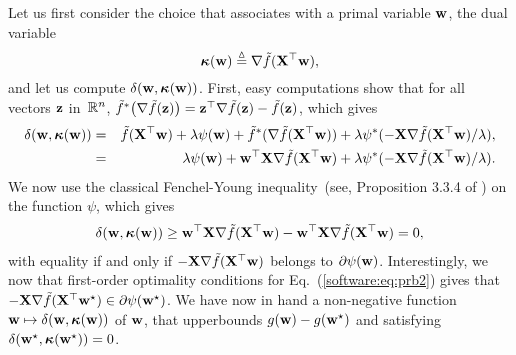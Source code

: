 \documentclass[a4paper, 11pt]{article}
\begin{document}
                Let us first consider the choice that associates with a primal variable ${\mathbf w}$, the
                dual variable 
                \begin{equation}
                {\boldsymbol\kappa}({\mathbf w}) \stackrel{\vartriangle}{=} \nabla \tilde{f}({\mathbf X}^\top{\mathbf w}), \label{software:eq:kappab}
                \end{equation}
                and let us compute $\delta({\mathbf w},{\boldsymbol\kappa}({\mathbf w}))$.
                First, easy computations show that for all vectors ${\mathbf z}$ in~${\mathbb R}^n$,
                $\tilde{f}^\ast\big(\nabla\tilde{f}({\mathbf z})\big) = {\mathbf z}^\top\nabla\tilde{f}({\mathbf z})-\tilde{f}({\mathbf z})$,
                which gives
                \begin{eqnarray}
                \delta({\mathbf w},{\boldsymbol\kappa}({\mathbf w})) &=& \tilde{f}({\mathbf X}^\top {\mathbf w}) + \lambda \psi({\mathbf w}) + \tilde{f}^\ast(\nabla\tilde{f}({\mathbf X}^\top{\mathbf w})) + \lambda\psi^\ast(-{\mathbf X}\nabla\tilde{f}({\mathbf X}^\top{\mathbf w})/ \lambda), \\
                                         &=& \lambda \psi({\mathbf w}) + {\mathbf w}^\top{\mathbf X}\nabla\tilde{f}({\mathbf X}^\top{\mathbf w}) + \lambda\psi^\ast(-{\mathbf X}\nabla\tilde{f}({\mathbf X}^\top{\mathbf w})/ \lambda). 
                                         \end{eqnarray}
                                         We now use the classical Fenchel-Young inequality~(see, Proposition
                                               3.3.4 of \cite{borwein}) on the function $\psi$, which gives
                                         \begin{displaymath}
                                         \begin{split}
                                         \delta({\mathbf w},{\boldsymbol\kappa}({\mathbf w}))  \geq  {\mathbf w}^\top{\mathbf X}\nabla\tilde{f}({\mathbf X}^\top{\mathbf w}) - {\mathbf w}^\top{\mathbf X}\nabla\tilde{f}({\mathbf X}^\top{\mathbf w}) = 0,
                                         \end{split}
                                         \end{displaymath}
                                         with equality if and only if $-{\mathbf X}\nabla\tilde{f}({\mathbf X}^\top{\mathbf w})$ belongs to
                                         $\partial \psi({\mathbf w})$.  Interestingly, we now that first-order optimality
                                         conditions for Eq.~(\ref{software:eq:prb2}) gives that
                                         $-{\mathbf X}\nabla\tilde{f}({\mathbf X}^\top{\mathbf w}^\star) \in \partial \psi({\mathbf w}^\star)$.
                                         We have now in hand a non-negative function ${\mathbf w} \mapsto \delta({\mathbf w},{\boldsymbol\kappa}({\mathbf w}))$ of ${\mathbf w}$, that
                                         upperbounds $g({\mathbf w})-g({\mathbf w}^\star)$ and satisfying $\delta({\mathbf w}^\star,{\boldsymbol\kappa}({\mathbf w}^\star))=0$.
\end{document}
